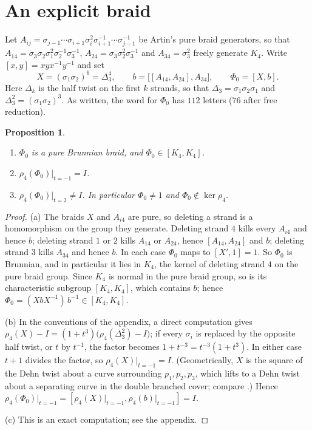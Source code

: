 \documentclass[11pt]{amsart}
\newtheorem{proposition}[lemma]{Proposition}
\theoremstyle{remark}
\newcommand{\at}{\big|_{t=-1}}
\begin{document}
\section{An explicit braid}

Let $A_{ij}=\sigma_{j-1}\cdots\sigma_{i+1}\sigma_i^2\sigma_{i+1}^{-1}\cdots\sigma_{j-1}^{-1}$ be Artin's pure braid generators, so that $A_{14}=\sigma_3\sigma_2\sigma_1^2\sigma_2^{-1}\sigma_3^{-1}$, $A_{24}=\sigma_3\sigma_2^2\sigma_3^{-1}$ and $A_{34}=\sigma_3^2$ freely generate $K_4$. Write $[x,y]=xyx^{-1}y^{-1}$ and set
\[
X=(\sigma_1\sigma_2)^6=\Delta_3^4,\qquad b=\bigl[[A_{14},A_{24}],A_{34}\bigr],\qquad \Phi_0=[X,b].
\]
Here $\Delta_k$ is the half twist on the first $k$ strands, so that $\Delta_3=\sigma_1\sigma_2\sigma_1$ and $\Delta_3^2=(\sigma_1\sigma_2)^3$. As written, the word for $\Phi_0$ has $112$ letters ($76$ after free reduction).

\begin{proposition}\label{prop:phi0}
\begin{enumerate}
\item[(a)] $\Phi_0$ is a pure Brunnian braid, and $\Phi_0\in[K_4,K_4]$.
\item[(b)] $\rho_4(\Phi_0)\at=I$.
\item[(c)] $\rho_4(\Phi_0)|_{t=2}\neq I$. In particular $\Phi_0\neq1$ and $\Phi_0\notin\ker\rho_4$.
\end{enumerate}
\end{proposition}

\begin{proof}
(a) The braids $X$ and $A_{i4}$ are pure, so deleting a strand is a homomorphism on the group they generate. Deleting strand $4$ kills every $A_{i4}$ and hence $b$; deleting strand $1$ or $2$ kills $A_{14}$ or $A_{24}$, hence $[A_{14},A_{24}]$ and $b$; deleting strand $3$ kills $A_{34}$ and hence $b$. In each case $\Phi_0$ maps to $[X',1]=1$. So $\Phi_0$ is Brunnian, and in particular it lies in $K_4$, the kernel of deleting strand $4$ on the pure braid group. Since $K_4$ is normal in the pure braid group, so is its characteristic subgroup $[K_4,K_4]$, which contains $b$; hence $\Phi_0=(XbX^{-1})\,b^{-1}\in[K_4,K_4]$.

(b) In the conventions of the appendix, a direct computation gives $\rho_4(X)-I=(1+t^3)\bigl(\rho_4(\Delta_3^2)-I\bigr)$; if every $\sigma_i$ is replaced by the opposite half twist, or $t$ by $t^{-1}$, the factor becomes $1+t^{-3}=t^{-3}(1+t^3)$. In either case $t+1$ divides the factor, so $\rho_4(X)\at=I$. (Geometrically, $X$ is the square of the Dehn twist about a curve surrounding $p_1,p_2,p_3$, which lifts to a Dehn twist about a separating curve in the double branched cover; compare \cite{BMP}.) Hence $\rho_4(\Phi_0)\at=[\rho_4(X)\at,\rho_4(b)\at]=I$.

(c) This is an exact computation; see the appendix.
\end{proof}
\end{document}
